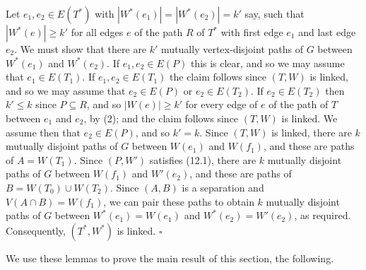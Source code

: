 Let $e_1, e_2 \in E(T^*)$ with $|W^*(e_1)| = |W^*(e_2)| = k'$ say, such that $|W^*(e)| \ge k'$ for all edges $e$ of the path $R$ of $T^*$ with first edge $e_1$ and last edge $e_2$. We must show that there are $k'$ mutually vertex-disjoint paths of $G$ between $W^*(e_1)$ and $W^*(e_2)$. If $e_1, e_2 \in E(P)$ this is clear, and so we may assume that $e_1 \in E(T_1)$.  If $e_1, e_2 \in E(T_1)$ the claim follows since $(T, W)$ is linked, and so we may assume that $e_2 \in E(P)$ or $e_2 \in E(T_2)$. If $e_2 \in E(T_2)$ then $k' \le k$ since $P \subseteq R$, and so $|W(e)| \ge k'$ for every edge of $e$ of the path of $T$ between $e_1$ and $e_2$, by (2); and the claim follows since $(T, W)$ is linked. We assume then that $e_2 \in E(P)$, and so $k' = k$. Since $(T, W)$ is linked, there are $k$ mutually disjoint paths of $G$ between $W(e_1)$ and $W(f_1)$, and these are paths of $A = W(T_1)$. Since $(P, W')$ satisfies (12.1), there are $k$ mutually disjoint paths of $G$ between $W(f_1)$ and $W'(e_2)$, and these are paths of $B = W(T_0) \cup W(T_2)$. Since $(A, B)$ is a separation and $V(A \cap B) = W(f_1)$, we can pair these paths to obtain $k$ mutually disjoint paths of $G$ between $W^*(e_1) = W(e_1)$ and $W^*(e_2) = W'(e_2)$, as required. Consequently, $(T^*, W^*)$ is linked. $\square$

We use these lemmas to prove the main result of this section, the following.

